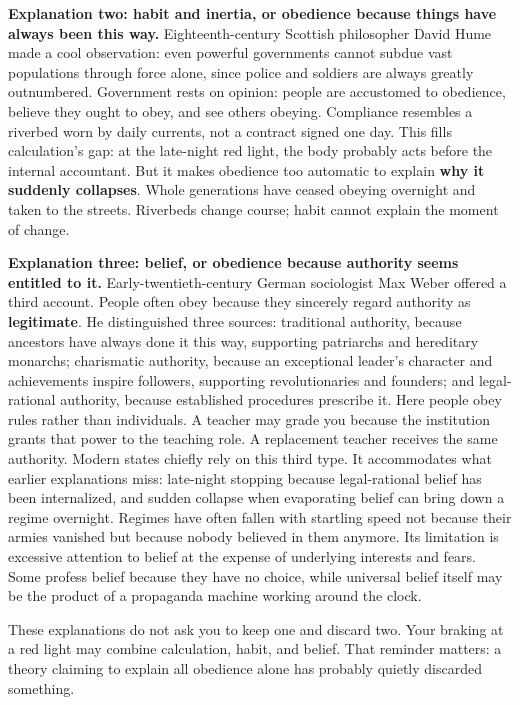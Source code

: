 \textbf{Explanation two: habit and inertia, or obedience because things have always been this way.} Eighteenth-century Scottish philosopher David Hume made a cool observation: even powerful governments cannot subdue vast populations through force alone, since police and soldiers are always greatly outnumbered. Government rests on opinion: people are accustomed to obedience, believe they ought to obey, and see others obeying. Compliance resembles a riverbed worn by daily currents, not a contract signed one day. This fills calculation's gap: at the late-night red light, the body probably acts before the internal accountant. But it makes obedience too automatic to explain \textbf{why it suddenly collapses}. Whole generations have ceased obeying overnight and taken to the streets. Riverbeds change course; habit cannot explain the moment of change.

\textbf{Explanation three: belief, or obedience because authority seems entitled to it.} Early-twentieth-century German sociologist Max Weber offered a third account. People often obey because they sincerely regard authority as \textbf{legitimate}. He distinguished three sources: traditional authority, because ancestors have always done it this way, supporting patriarchs and hereditary monarchs; charismatic authority, because an exceptional leader's character and achievements inspire followers, supporting revolutionaries and founders; and legal-rational authority, because established procedures prescribe it. Here people obey rules rather than individuals. A teacher may grade you because the institution grants that power to the teaching role. A replacement teacher receives the same authority. Modern states chiefly rely on this third type. It accommodates what earlier explanations miss: late-night stopping because legal-rational belief has been internalized, and sudden collapse when evaporating belief can bring down a regime overnight. Regimes have often fallen with startling speed not because their armies vanished but because nobody believed in them anymore. Its limitation is excessive attention to belief at the expense of underlying interests and fears. Some profess belief because they have no choice, while universal belief itself may be the product of a propaganda machine working around the clock.

These explanations do not ask you to keep one and discard two. Your braking at a red light may combine calculation, habit, and belief. That reminder matters: a theory claiming to explain all obedience alone has probably quietly discarded something.

